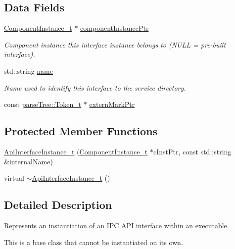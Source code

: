\subsection*{Data Fields}
\begin{DoxyCompactItemize}
\item 
\hyperlink{struct_component_instance__t}{Component\+Instance\+\_\+t} $\ast$ \hyperlink{struct_api_interface_instance__t_ac45a000cb15eeb38011af68a4af38b46}{component\+Instance\+Ptr}
\begin{DoxyCompactList}\small\item\em Component instance this interface instance belongs to (N\+U\+LL = pre-\/built interface). \end{DoxyCompactList}\item 
std\+::string \hyperlink{struct_api_interface_instance__t_a57a4147c979e5432ed05c35146314401}{name}
\begin{DoxyCompactList}\small\item\em Name used to identify this interface to the service directory. \end{DoxyCompactList}\item 
const \hyperlink{structparse_tree_1_1_token__t}{parse\+Tree\+::\+Token\+\_\+t} $\ast$ \hyperlink{struct_api_interface_instance__t_a61696b734f1e0de91cfb24e5493269fd}{extern\+Mark\+Ptr}
\end{DoxyCompactItemize}
\subsection*{Protected Member Functions}
\begin{DoxyCompactItemize}
\item 
\hyperlink{struct_api_interface_instance__t_a1aa9dbc0c15682eef259f4007ea79cb6}{Api\+Interface\+Instance\+\_\+t} (\hyperlink{struct_component_instance__t}{Component\+Instance\+\_\+t} $\ast$c\+Inst\+Ptr, const std\+::string \&internal\+Name)
\item 
virtual \hyperlink{struct_api_interface_instance__t_a6c726c0282f4890f219afd3900109c10}{$\sim$\+Api\+Interface\+Instance\+\_\+t} ()
\end{DoxyCompactItemize}


\subsection{Detailed Description}
Represents an instantiation of an I\+PC A\+PI interface within an executable.

This is a base class that cannot be instantiated on its own. 

